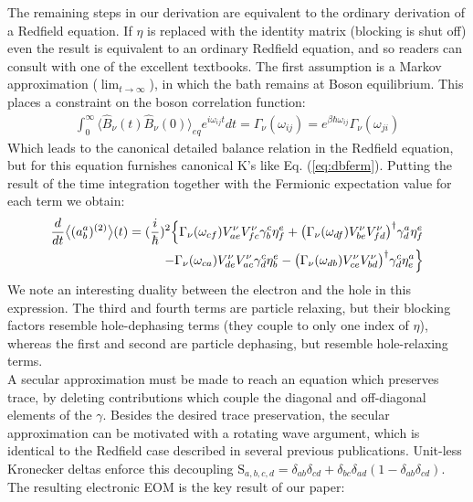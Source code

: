 \documentclass[aip,jcp,preprint,floatfix]{revtex4-1}
\begin{document}
{\indent     The remaining steps in our derivation are equivalent to the ordinary derivation of a Redfield equation. If $\eta$ is replaced with the identity matrix (blocking is shut off) even the result is equivalent to an ordinary Redfield equation, and so readers can consult with one of the excellent textbooks\cite{nitzan2006chemical}. The first assumption is a Markov approximation ($\lim_{t\rightarrow \infty}$), in which the bath remains at Boson equilibrium. This places a constraint on the boson correlation function: 
\begin{align}
\int_0^\infty \big\langle \hat{B}_\nu(t)\hat{B}_\nu(0) \big\rangle_{eq} e^{i\omega_{ij} t} dt= \Gamma_\nu(\omega_{ij}) = e^{\beta\hbar\omega_{ij}}\Gamma_\nu(\omega_{ji})
\end{align}
Which leads to the canonical detailed balance relation in the Redfield equation, but for this equation furnishes canonical K's like Eq. (\ref{eq:dbferm}). Putting the result of the time integration together with the Fermionic expectation value for each term we obtain:
\begin{align}
 \frac{d}{dt} \big\langle (a^{a}_b)^{(2)} \big\rangle(t) = (\frac{i}{\hbar})^2 \Big\{ \Gamma_\nu(\omega_{cf})V^\nu_{ae}V^\nu_{fc}\gamma^c_b\eta^e_f+
\big(\Gamma_\nu(\omega_{df})V^\nu_{be}V^\nu_{fd}\big)^\dagger \gamma^a_d\eta^e_f \\ \notag - \Gamma_\nu(\omega_{ca})V^\nu_{de}V^\nu_{ac}\gamma^c_d\eta^e_b -
\big(\Gamma_\nu(\omega_{db})V^\nu_{ce}V^\nu_{bd}\big)^\dagger \gamma^c_d\eta^a_e \Big\}
\label{eq:etcl}
\end{align}
We note an interesting duality between the electron and the hole in this expression. The third and fourth terms are particle relaxing, but their blocking factors resemble hole-dephasing terms (they couple to only one index of $\eta$), whereas the first and second are particle dephasing, but resemble hole-relaxing terms.\\
\indent A secular approximation must be made to reach an equation which preserves trace, by deleting contributions which couple the diagonal and off-diagonal elements of the $\gamma$. Besides the desired trace preservation, the secular approximation can be motivated with a rotating wave argument, which is identical to the Redfield case described in several previous publications\cite{PhysRevB.88.174514,muka}. Unit-less Kronecker deltas enforce this decoupling $\text{S}_{a,b,c,d}=\delta_{ab}\delta_{cd}+\delta_{bc}\delta_{ad}(1-\delta_{ab}\delta_{cd})$. The resulting electronic EOM is the key result of our paper:
}
\end{document}
